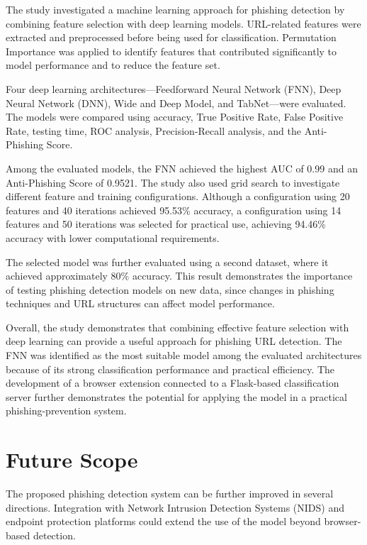 \documentclass[12pt,a4paper]{report}
\begin{document}
The study investigated a machine learning approach for phishing detection by combining feature selection with deep learning models. URL-related features were extracted and preprocessed before being used for classification. Permutation Importance was applied to identify features that contributed significantly to model performance and to reduce the feature set.

Four deep learning architectures---Feedforward Neural Network (FNN), Deep Neural Network (DNN), Wide and Deep Model, and TabNet---were evaluated. The models were compared using accuracy, True Positive Rate, False Positive Rate, testing time, ROC analysis, Precision-Recall analysis, and the Anti-Phishing Score.

Among the evaluated models, the FNN achieved the highest AUC of 0.99 and an Anti-Phishing Score of 0.9521. The study also used grid search to investigate different feature and training configurations. Although a configuration using 20 features and 40 iterations achieved 95.53\% accuracy, a configuration using 14 features and 50 iterations was selected for practical use, achieving 94.46\% accuracy with lower computational requirements.

The selected model was further evaluated using a second dataset, where it achieved approximately 80\% accuracy. This result demonstrates the importance of testing phishing detection models on new data, since changes in phishing techniques and URL structures can affect model performance.

Overall, the study demonstrates that combining effective feature selection with deep learning can provide a useful approach for phishing URL detection. The FNN was identified as the most suitable model among the evaluated architectures because of its strong classification performance and practical efficiency. The development of a browser extension connected to a Flask-based classification server further demonstrates the potential for applying the model in a practical phishing-prevention system.

\section{Future Scope}

The proposed phishing detection system can be further improved in several directions. Integration with Network Intrusion Detection Systems (NIDS) and endpoint protection platforms could extend the use of the model beyond browser-based detection.
\end{document}
